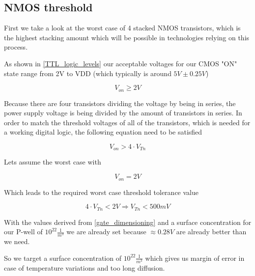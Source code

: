 \subsection{NMOS threshold}\label{nmos_dimensioning}
First we take a look at the worst case of 4 stacked NMOS transistors, which is the highest stacking amount which will be possible in technologies relying on this process.


As shown in  \autoref{TTL_logic_levels} our acceptable voltages for our CMOS "ON" state range from 2V to VDD (which typically is around $5V\pm0.25V$)

\begin{equation}
V_{on} \geq 2V
\end{equation}

Because there are four transistors dividing the voltage by being in series, the power supply voltage is being divided by the amount of transistors in series.
In order to match the threshold voltages of all of the transistors, which is needed for a working digital logic, the following equation need to be satisfied

\begin{equation}
V_{on} > 4 \cdot V_{Tn}
\end{equation}

Lets assume the worst case with

\begin{equation}
V_{on} = 2V
\end{equation}

Which leads to the required worst case threshold tolerance value

\begin{equation}
4 \cdot V_{Tn} < 2V
\Rightarrow
V_{Tn} < 500mV
\end{equation}
 
With the values derived from \autoref{gate_dimensioning} and a surface concentration for our P-well of $10^{22}\frac{1}{m^3}$ we are already set because $\approx 0.28V$ are already better than we need.

So we target a surface concentration of $10^{22}\frac{1}{m^3}$ which gives us margin of error in case of temperature variations and too long diffusion.
  
